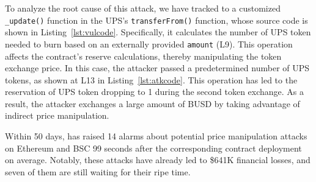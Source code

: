 To analyze the root cause of this attack, we have tracked to a customized \texttt{\_update()} function in the UPS's \texttt{transferFrom()} function, whose source code is shown in Listing~\ref{lst:vulcode}.
Specifically, it calculates the number of UPS token needed to burn based on an externally provided \texttt{amount} (L9). This operation affects the contract's reserve calculations, thereby manipulating the token exchange price. 
In this case, the attacker passed a predetermined number of UPS tokens, as shown at L13 in Listing~\ref{lst:atkcode}. This operation has led to the reservation of UPS token dropping to 1 during the second token exchange.
As a result, the attacker exchanges a large amount of BUSD by taking advantage of indirect price manipulation.


\begin{tcolorbox}[title= Answer to RQ3, left=2pt, right=2pt, top=0.5pt,bottom=0.5pt, colback=gray!5,colframe=gray!80!black]
Within 50 days, {\tool} has raised 14 alarms about potential price manipulation attacks on Ethereum and BSC 99 seconds after the corresponding contract deployment on average. Notably, these attacks have already led to \$641K financial losses, and seven of them are still waiting for their ripe time.
\end{tcolorbox}